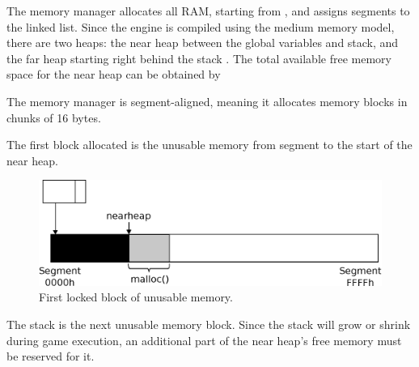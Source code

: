 \documentclass[book.tex]{subfiles}
\begin{document}
\par

\par  
The memory manager allocates all RAM, starting from , and assigns segments to the linked list. Since the engine is compiled using the medium memory model, there are two heaps: the near heap between the global variables and stack, and the far heap starting right behind the stack . The total available free memory space for the near heap can be obtained by\\
\par


\par  
The memory manager is segment-aligned, meaning it allocates memory blocks in chunks of 16 bytes. \\




\par  
The first block allocated is the unusable memory from segment  to the start of the near heap.\\



\par  

\begin{figure}[H]
\centering
 \includegraphics[width=\textwidth]{imgs/drawings/mm_start.eps}
 \caption{First locked block of unusable memory.}
 \end{figure}
 \par

\par
The stack is the next unusable memory block. Since the stack will grow or shrink during game execution, an additional part of the near heap's free memory must be reserved for it.\\

\par

\par  
\end{document}
